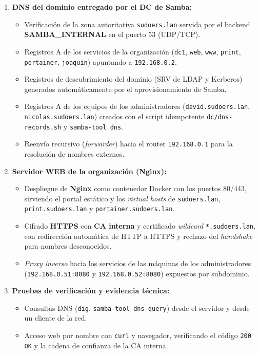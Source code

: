 \begin{enumerate}[label=\textbf{\arabic*.}]
  \item \textbf{DNS del dominio entregado por el DC de Samba:}
  \begin{itemize}
    \item Verificaci\'on de la zona autoritativa \texttt{sudoers.lan} servida
          por el backend \textbf{SAMBA\_INTERNAL} en el puerto 53 (UDP/TCP).
    \item Registros A de los servicios de la organizaci\'on
          (\texttt{dc1}, \texttt{web}, \texttt{www}, \texttt{print},
          \texttt{portainer}, \texttt{joaquin}) apuntando a
          \texttt{192.168.0.2}.
    \item Registros de descubrimiento del dominio (SRV de LDAP y Kerberos)
          generados autom\'aticamente por el aprovisionamiento de Samba.
    \item Registros A de los equipos de los administradores
          (\texttt{david.sudoers.lan}, \texttt{nicolas.sudoers.lan}) creados
          con el script idempotente \texttt{dc/dns-records.sh} y
          \texttt{samba-tool dns}.
    \item Reenv\'io recursivo (\textit{forwarder}) hacia el router
          \texttt{192.168.0.1} para la resoluci\'on de nombres externos.
  \end{itemize}

  \item \textbf{Servidor WEB de la organizaci\'on (Nginx):}
  \begin{itemize}
    \item Despliegue de \textbf{Nginx} como contenedor Docker con los puertos
          80/443, sirviendo el portal est\'atico y los \textit{virtual hosts}
          de \texttt{sudoers.lan}, \texttt{print.sudoers.lan} y
          \texttt{portainer.sudoers.lan}.
    \item Cifrado \textbf{HTTPS} con \textbf{CA interna} y certificado
          \textit{wildcard} \texttt{*.sudoers.lan}, con redirecci\'on
          autom\'atica de HTTP a HTTPS y rechazo del \textit{handshake} para
          nombres desconocidos.
    \item \textit{Proxy inverso} hacia los servicios de las m\'aquinas de los
          administradores (\texttt{192.168.0.51:8080} y
          \texttt{192.168.0.52:8080}) expuestos por subdominio.
  \end{itemize}

  \item \textbf{Pruebas de verificaci\'on y evidencia t\'ecnica:}
  \begin{itemize}
    \item Consultas DNS (\texttt{dig}, \texttt{samba-tool dns query}) desde el
          servidor y desde un cliente de la red.
    \item Acceso web por nombre con \texttt{curl} y navegador, verificando el
          c\'odigo \texttt{200 OK} y la cadena de confianza de la CA interna.
  \end{itemize}
\end{enumerate}

